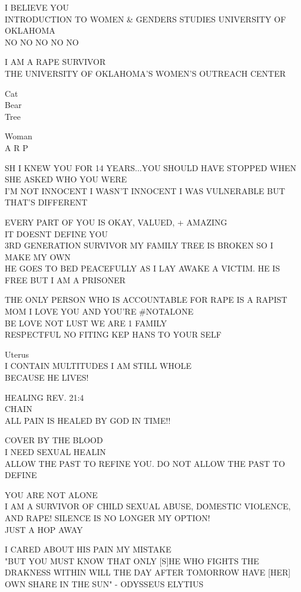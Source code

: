 \documentclass[10pt,letterpaper]{article}
\begin{document}
I BELIEVE YOU\\
INTRODUCTION TO WOMEN \& GENDERS STUDIES UNIVERSITY OF OKLAHOMA\\
NO NO NO NO NO

I AM A RAPE SURVIVOR\\
THE UNIVERSITY OF OKLAHOMA'S WOMEN'S OUTREACH CENTER

Cat\\
Bear\\
Tree

Woman\\
A R P

SH I KNEW YOU FOR 14 YEARS...YOU SHOULD HAVE STOPPED WHEN SHE ASKED WHO YOU WERE\\
I'M NOT INNOCENT I WASN'T INNOCENT I WAS VULNERABLE BUT THAT'S DIFFERENT

EVERY PART OF YOU IS OKAY, VALUED, + AMAZING\\
IT DOESNT DEFINE YOU\\
3RD GENERATION SURVIVOR MY FAMILY TREE IS BROKEN SO I MAKE MY OWN\\
HE GOES TO BED PEACEFULLY AS I LAY AWAKE A VICTIM.  HE IS FREE BUT I AM A PRISONER

THE ONLY PERSON WHO IS ACCOUNTABLE FOR RAPE IS A RAPIST MOM I LOVE YOU AND YOU'RE \#NOTALONE\\
BE LOVE NOT LUST WE ARE 1 FAMILY\\
RESPECTFUL NO FITING KEP HANS TO YOUR SELF

Uterus\\
I CONTAIN MULTITUDES I AM STILL WHOLE\\
BECAUSE HE LIVES!

HEALING REV. 21:4\\
CHAIN\\
ALL PAIN IS HEALED BY GOD IN TIME!!

COVER BY THE BLOOD\\
I NEED SEXUAL HEALIN\\
ALLOW THE PAST TO REFINE YOU.  DO NOT ALLOW THE PAST TO DEFINE

YOU ARE NOT ALONE\\
I AM A SURVIVOR OF CHILD SEXUAL ABUSE, DOMESTIC VIOLENCE, AND RAPE!  SILENCE IS NO LONGER MY OPTION!\\
JUST A HOP AWAY

I CARED ABOUT HIS PAIN MY MISTAKE\\
"BUT YOU MUST KNOW THAT ONLY {[}S{]}HE WHO FIGHTS THE DRAKNESS WITHIN WILL THE DAY AFTER TOMORROW HAVE {[}HER{]} OWN SHARE IN THE SUN" {-} ODYSSEUS ELYTIUS
\end{document}
